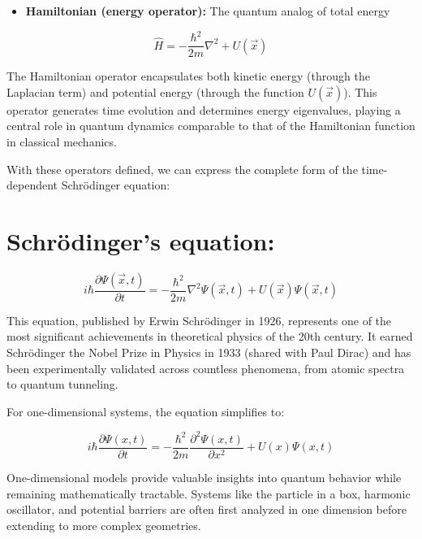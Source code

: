 \documentclass[italian]{HKNdocument}
\begin{document}
\begin{itemize}
  \item \textbf{Hamiltonian (energy operator):} The quantum analog of total energy
\end{itemize}

\begin{equation}
\hat{H}=-\frac{\hbar^{2}}{2 m} \nabla^{2}+U(\vec{x})
\end{equation}

The Hamiltonian operator encapsulates both kinetic energy (through the Laplacian term) and potential energy (through the function $U(\vec{x})$). This operator generates time evolution and determines energy eigenvalues, playing a central role in quantum dynamics comparable to that of the Hamiltonian function in classical mechanics.

With these operators defined, we can express the complete form of the time-dependent Schrödinger equation:

\section{Schrödinger's equation:}

\begin{equation}
i \hbar \frac{\partial \Psi(\vec{x}, t)}{\partial t}=-\frac{\hbar^{2}}{2 m} \nabla^{2} \Psi(\vec{x}, t)+U(\vec{x}) \Psi(\vec{x}, t)
\end{equation}

This equation, published by Erwin Schrödinger in 1926, represents one of the most significant achievements in theoretical physics of the 20th century. It earned Schrödinger the Nobel Prize in Physics in 1933 (shared with Paul Dirac) and has been experimentally validated across countless phenomena, from atomic spectra to quantum tunneling.

For one-dimensional systems, the equation simplifies to:

\begin{equation}
i \hbar \frac{\partial \Psi(x, t)}{\partial t}=-\frac{\hbar^{2}}{2 m} \frac{\partial^{2} \Psi(x, t)}{\partial x^{2}}+U(x) \Psi(x, t)
\end{equation}

One-dimensional models provide valuable insights into quantum behavior while remaining mathematically tractable. Systems like the particle in a box, harmonic oscillator, and potential barriers are often first analyzed in one dimension before extending to more complex geometries.
\end{document}
